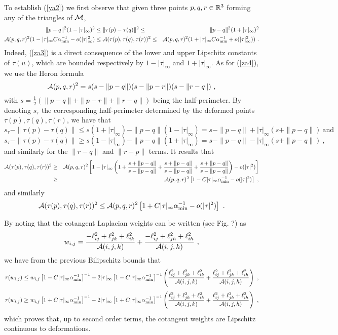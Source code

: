 To establish (\ref{ya2}) we first observe that given three points $p, q, r \in {\mathbb{R}}^3$ forming any of the triangles of ${\mathcal{M}}$, 
\begin{eqnarray}
\| p - q \|^2 (1 - | \tau |_\infty)^2 &\leq \| \tau(p) - \tau(q) \|^2 \leq& \| p - q \|^2 (1 + | \tau |_\infty)^2 \label{za3} \\
{\mathcal A}(p,q,r)^2 ( 1 - | \tau |_\infty C \alpha_{\text{min}}^{-1} - o(|\tau |_\infty^2) & \leq {\mathcal A}(\tau(p), \tau(q), \tau(r) )^2 \leq & {\mathcal A}(p,q,r)^2 ( 1 + | \tau |_\infty C \alpha_{\text{min}}^{-1} + o(|\tau |_\infty^2))~. \label{za4}  
\end{eqnarray}
Indeed, (\ref{za3}) is a direct consequence of the lower and upper Lipschitz constants of $\tau(u)$, which are bounded respectively by $1- | \tau|_\infty$ 
and $1 + | \tau|_\infty$. As for (\ref{za4}), we use the Heron formula 
$${\mathcal A}(p,q,r)^2 = s ( s - \| p - q \|)( s - \| p - r \|)( s - \| r - q \|)~,$$
with $s = \frac{1}{2}( \| p - q \| + \| p - r \| + \| r - q \|)$ being the half-perimeter.
By denoting $s_\tau$ the corresponding half-perimeter determined by the deformed points $\tau(p), \tau(q), \tau(r)$, 
we have that 
$$ s_\tau - \| \tau(p) - \tau(q) \| \leq s(1 + |\tau|_\infty) - \| p - q \| ( 1 - |\tau|_\infty) = s -  \| p - q \|  + |\tau|_\infty( s + \| p - q \|)~\text{and }$$
$$ s_\tau - \| \tau(p) - \tau(q) \| \geq s(1 - |\tau|_\infty) - \| p - q \| ( 1 + |\tau|_\infty) = s -  \| p - q \|  - |\tau|_\infty( s + \| p - q \|)~,$$
and similarly for the $\| r - q\|$ and $\|r - p \|$ terms. 
It results that
\begin{eqnarray*}
{\mathcal A}(\tau(p),\tau(q),\tau(r))^2 &\geq& {\mathcal A}(p,q,r)^2 \left[ 1 - | \tau|_\infty \left( 1 + \frac{s + \| p - q \|}{s - \| p -q \|} + \frac{s + \| p - q \|}{s - \| p -q \|} + \frac{s + \| p - q \|}{s - \| p -q \|} \right) - o( |\tau|^2 )\right ]  \\
&\geq & {\mathcal A}(p,q,r)^2 \left[ 1 - C | \tau|_\infty \alpha_{\text{min}}^{-1}  - o( |\tau|^2) \right]~,
\end{eqnarray*}
and similarly 
$${\mathcal A}(\tau(p),\tau(q),\tau(r))^2  \leq {\mathcal A}(p,q,r)^2 \left[ 1 + C | \tau|_\infty \alpha_{\text{min}}^{-1}  - o( |\tau|^2) \right] ~.$$

By noting that the cotangent Laplacian weights can be written (see Fig. ?) as
$$w_{i,j} = \frac{- \ell_{ij}^2 + \ell_{jk}^2 + \ell_{ik}^2 }{{\mathcal A}(i,j,k)} + \frac{- \ell_{ij}^2 + \ell_{jh}^2 + \ell_{ih}^2 }{{\mathcal A}(i,j,h)}~, $$
we have from the previous Bilipschitz bounds that
$$\tau( w_{i,j}) \leq w_{i,j} \left[ 1 - C | \tau|_\infty \alpha_{\text{min}}^{-1}\right]^{-1} + 2 | \tau|_\infty \left[ 1 - C | \tau|_\infty \alpha_{\text{min}}^{-1}\right]^{-1} \left( \frac{\ell_{ij}^2 + \ell_{jk}^2 + \ell_{ik}^2}{{\mathcal A}(i,j,k)} + \frac{\ell_{ij}^2 + \ell_{jh}^2 + \ell_{ih}^2}{{\mathcal A}(i,j,h)} \right)~,$$
$$\tau( w_{i,j}) \geq w_{i,j} \left[ 1 + C | \tau|_\infty \alpha_{\text{min}}^{-1}\right]^{-1} - 2 | \tau|_\infty \left[ 1 + C | \tau|_\infty \alpha_{\text{min}}^{-1}\right]^{-1} \left( \frac{\ell_{ij}^2 + \ell_{jk}^2 + \ell_{ik}^2}{{\mathcal A}(i,j,k)} + \frac{\ell_{ij}^2 + \ell_{jh}^2 + \ell_{ih}^2}{{\mathcal A}(i,j,h)} \right)~,$$
which proves that, up to second order terms, the cotangent weights are Lipschitz continuous to deformations. 


